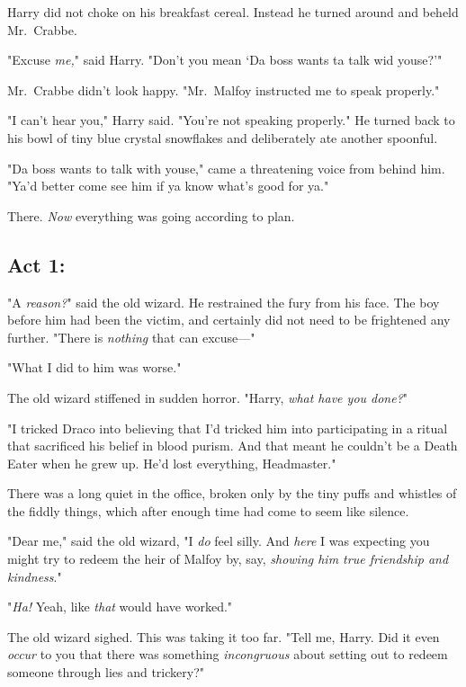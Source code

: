 Harry did not choke on his breakfast cereal. Instead he turned around and
beheld Mr.~Crabbe.

"Excuse \emph{me,}" said Harry. "Don't you mean `Da boss wants ta talk wid
youse?'"

Mr.~Crabbe didn't look happy. "Mr.~Malfoy instructed me to speak properly."

"I can't hear you," Harry said. "You're not speaking properly." He turned back
to his bowl of tiny blue crystal snowflakes and deliberately ate another
spoonful.

"Da boss wants to talk with youse," came a threatening voice from behind him.
"Ya'd better come see him if ya know what's good for ya."

There. \emph{Now} everything was going according to plan.
\sbreak
\vspace{-2\baselineskip}
\subsection{Act 1:}

"A \emph{reason?}" said the old wizard. He restrained the fury from his face.
The boy before him had been the victim, and certainly did not need to be
frightened any further. "There is \emph{nothing} that can excuse\mbox{---}"

"What I did to him was worse."

The old wizard stiffened in sudden horror. "Harry, \emph{what have you done?}"

"I tricked Draco into believing that I'd tricked him into participating in a
ritual that sacrificed his belief in blood purism. And that meant he couldn't
be a Death Eater when he grew up. He'd lost everything, Headmaster."

There was a long quiet in the office, broken only by the tiny puffs and
whistles of the fiddly things, which after enough time had come to seem like
silence.

"Dear me," said the old wizard, "I \emph{do} feel silly. And \emph{here} I was
expecting you might try to redeem the heir of Malfoy by, say, \emph{showing him
true friendship and kindness}."

"\emph{Ha!} Yeah, like \emph{that} would have worked."

The old wizard sighed. This was taking it too far. "Tell me, Harry. Did it even
\emph{occur} to you that there was something \emph{incongruous} about setting
out to redeem someone through lies and trickery?"


